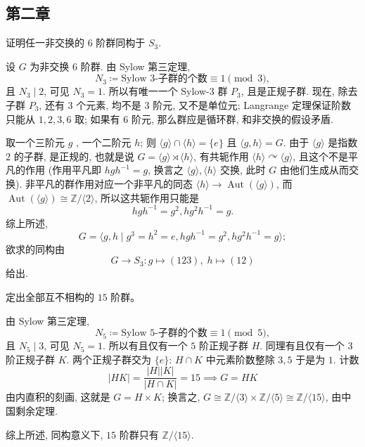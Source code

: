\subsection{第二章}
\setcounter{pb}{21}

\begin{problem}
    证明任一非交换的 $6$ 阶群同构于 $S_3 $. 
\end{problem}

\begin{solution}
    设 $G$ 为非交换 $6$ 阶群. 由 Sylow 第三定理,  
        \[
            N_{3}\coloneqq \text{Sylow $3$-子群的个数}\equiv 1\pmod3,
        \]
    且 $N_{3}\mid 2$, 可见 $N_{3}=1$. 所以有唯一一个 Sylow-$3$ 群 $P_{3}$, 且是正规子群. 
    现在, 除去子群 $P_{3}$, 还有 $3$ 个元素, 均不是 $3$ 阶元, 又不是单位元; Langrange 定理保证阶数只能从 $1,2,3,6$ 取; 
    如果有 $6$ 阶元, 那么群应是循环群, 和非交换的假设矛盾. 
    \par 取一个三阶元 $g$ , 一个二阶元 $h$; 则 $\langle g \rangle\cap \langle h \rangle=\{e\}$ 且 $\langle g,h \rangle=G$. 
    由于 $\langle g \rangle$ 是指数 $2$ 的子群, 是正规的, 也就是说 $G=\langle g \rangle \rtimes \langle h \rangle$, 有共轭作用 $\langle h \rangle \curvearrowright \langle g \rangle$, 且这个不是平凡的作用 
    (作用平凡即 $h g h^{-1}= g$, 换言之 $\langle g \rangle, \langle h \rangle$ 交换, 此时 $G$ 由他们生成从而交换). 
    非平凡的群作用对应一个非平凡的同态 $\langle h \rangle\to \operatorname{Aut}(\langle g \rangle)$, 而 $\operatorname{Aut}(\langle g \rangle)\cong \mathbb{Z}/\langle 2 \rangle$, 
    所以这共轭作用只能是
        \[
            h g h^{-1}=g^{2}, h g^{2} h^{-1}=g.
        \]
    综上所述, 
        \[
            G=\langle g,h\mid g^{3}=h^{2}=e, h g h^{-1}=g^{2}, h g^{2} h^{-1}=g \rangle;
        \]
    欲求的同构由 
        \[
            G\to S_{3} \colon g\mapsto (1 2 3),\; h\mapsto (1 2)
        \]
    给出.
\end{solution}
\begin{problem}
    定出全部互不相构的 $15$ 阶群。
\end{problem}

\begin{solution}
    由 Sylow 第三定理,  
        \[
            N_{5}\coloneqq \text{Sylow $5$-子群的个数}\equiv 1\pmod5,
        \]
    且 $N_{5}\mid 3$, 可见 $N_{5}=1$. 所以有且仅有一个 $5$ 阶正规子群 $H$. 
    同理有且仅有一个 $3$ 阶正规子群 $K$. 两个正规子群交为 $\{e\}$: $H\cap K$ 中元素阶数整除 $3,5$ 于是为 $1$. 
    计数 
        \[
            |H K|=\frac{|H||K|}{|H\cap K|}=15\implies G= H K
        \]
    由内直积的刻画, 这就是 $G=H\times K$; 换言之, $G\cong \mathbb{Z}/\langle 3 \rangle\times\mathbb{Z}/\langle 5 \rangle\cong\mathbb{Z}/\langle 15 \rangle$, 由中国剩余定理. 
    \par 综上所述, 同构意义下, $15$ 阶群只有 $\mathbb{Z}/\langle 15 \rangle$.
\end{solution}

